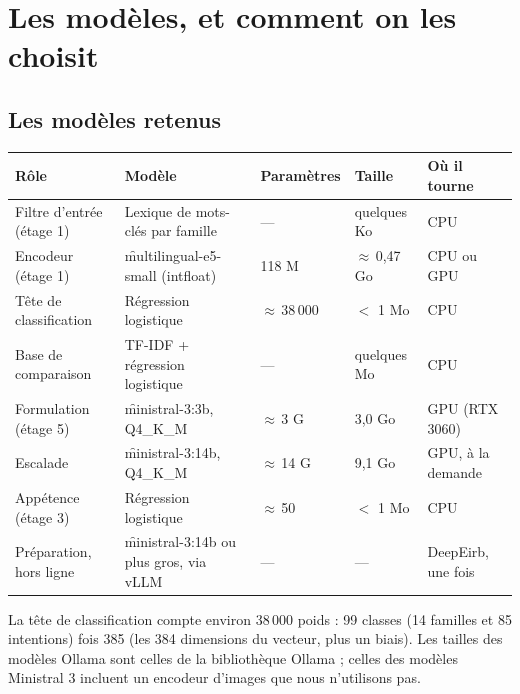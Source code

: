 \chapter{Les modèles, et comment on les choisit}
\label{ch:modeles}

\section{Les modèles retenus}

\begin{center}\small
\begin{tabularx}{\textwidth}{@{}L{2.3cm} L{4.3cm} l l Y@{}}
\toprule
\textbf{Rôle} & \textbf{Modèle} & \textbf{Paramètres} & \textbf{Taille} & \textbf{Où il tourne} \\
\midrule
Filtre d'entrée (étage 1) & Lexique de mots-clés par famille & --- & quelques Ko & CPU \\
Encodeur (étage 1) & \f{multilingual-e5-small} (intfloat) & 118 M & $\approx$\,0,47 Go & CPU ou GPU \\
Tête de classification & Régression logistique & $\approx$\,38\,000 & $<$ 1 Mo & CPU \\
Base de comparaison & TF-IDF + régression logistique & --- & quelques Mo & CPU \\
Formulation (étage 5) & \f{ministral-3:3b}, Q4\_K\_M & $\approx$\,3 G & 3,0 Go & GPU (RTX 3060) \\
Escalade & \f{ministral-3:14b}, Q4\_K\_M & $\approx$\,14 G & 9,1 Go & GPU, à la demande \\
Appétence (étage 3) & Régression logistique & $\approx$\,50 & $<$ 1 Mo & CPU \\
Préparation, hors ligne & \f{ministral-3:14b} ou plus gros, via vLLM & --- & --- & DeepEirb, une fois \\
\bottomrule
\end{tabularx}
\end{center}

La tête de classification compte environ 38\,000 poids : 99 classes (14 familles et 85
intentions) fois 385 (les 384 dimensions du vecteur, plus un biais). Les tailles des modèles
Ollama sont celles de la bibliothèque Ollama ; celles des modèles Ministral 3 incluent un encodeur
d'images que nous n'utilisons pas.

